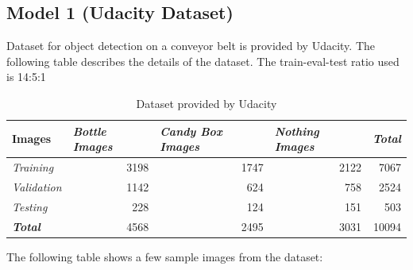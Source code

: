\documentclass[10pt,journal,compsoc]{IEEEtran}
\begin{document}
\subsection{Model 1 (Udacity Dataset)}
Dataset for object detection on a conveyor belt is provided by Udacity. The following table describes the details of the dataset. The train-eval-test ratio used is 14:5:1


\begin{table}[h]
\renewcommand{\arraystretch}{1.5}
\begin{tabular}{|l|r|r|r|r|}
\hline
\textbf{Images}         & \multicolumn{1}{l|}{\textit{Bottle Images}} & \multicolumn{1}{l|}{\textit{Candy Box Images}} & \multicolumn{1}{l|}{\textit{Nothing Images}} & \multicolumn{1}{l|}{\textit{\textbf{Total}}} \\ \hline
\textit{Training}       & 3198                                        & 1747                                           & 2122                                         & 7067                                         \\ \hline
\textit{Validation}     & 1142                                        & 624                                            & 758                                          & 2524                                         \\ \hline
\textit{Testing}        & 228                                         & 124                                            & 151                                          & 503                                          \\ \hline
\textit{\textbf{Total}} & 4568                                        & 2495                                           & 3031                                         & 10094                                        \\ \hline
\end{tabular} \renewcommand{\arraystretch}{1.5} \caption{Dataset provided by Udacity}
\label{Table}
\end{table}

The following table shows a few sample images from the dataset:
\end{document}
